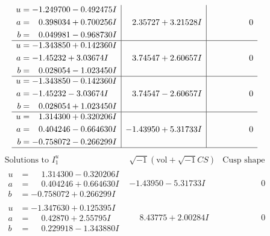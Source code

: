 \documentclass[1p]{elsarticle_modified}
\theoremstyle{definition}
\newcommand{\I}{\sqrt{-1}}
\begin{document}
$$\begin{array}{c|c|c}
\begin{aligned}
u &= -1.249700 - 0.492475 I \\
a &= \phantom{-}0.398034 + 0.700256 I \\
b &= \phantom{-}0.049981 - 0.968730 I\end{aligned}
 & \phantom{-}2.35727 + 3.21528 I & \phantom{-0.000000 } 0 \\ \hline\begin{aligned}
u &= -1.343850 + 0.142360 I \\
a &= -1.45232 + 3.03674 I \\
b &= \phantom{-}0.028054 - 1.023450 I\end{aligned}
 & \phantom{-}3.74547 + 2.60657 I & \phantom{-0.000000 } 0 \\ \hline\begin{aligned}
u &= -1.343850 - 0.142360 I \\
a &= -1.45232 - 3.03674 I \\
b &= \phantom{-}0.028054 + 1.023450 I\end{aligned}
 & \phantom{-}3.74547 - 2.60657 I & \phantom{-0.000000 } 0 \\ \hline\begin{aligned}
u &= \phantom{-}1.314300 + 0.320206 I \\
a &= \phantom{-}0.404246 - 0.664630 I \\
b &= -0.758072 - 0.266299 I\end{aligned}
 & -1.43950 + 5.31733 I & \phantom{-0.000000 } 0\\
 \hline 
 \end{array}$$\newpage$$\begin{array}{c|c|c}  
\text{Solutions to }I^u_{1}& \I (\text{vol} + \sqrt{-1}CS) & \text{Cusp shape}\\
 \hline 
\begin{aligned}
u &= \phantom{-}1.314300 - 0.320206 I \\
a &= \phantom{-}0.404246 + 0.664630 I \\
b &= -0.758072 + 0.266299 I\end{aligned}
 & -1.43950 - 5.31733 I & \phantom{-0.000000 } 0 \\ \hline\begin{aligned}
u &= -1.347630 + 0.125395 I \\
a &= \phantom{-}0.42870 + 2.55795 I \\
b &= \phantom{-}0.229918 - 1.343880 I\end{aligned}
 & \phantom{-}8.43775 + 2.00284 I & \phantom{-0.000000 } 0 \\ \hline\begin{aligned}

\end{aligned}
\end{array}$$
\end{document}
